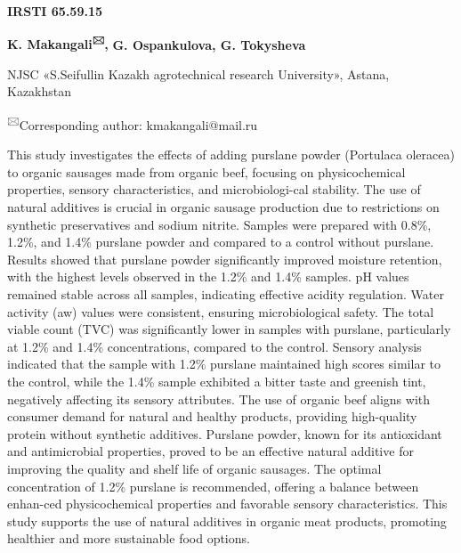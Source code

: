 




\newpage
{\bfseries IRSTI 65.59.15}

\begin{center}

{\bfseries K. Makangali\textsuperscript{🖂},} {\bfseries G. Ospankulova, G.
Tokysheva}

NJSC «S.Seifullin Kazakh agrotechnical research University», Astana,
Kazakhstan
\end{center}

\textsuperscript{🖂}Corresponding author: kmakangali@mail.ru

This study investigates the effects of adding purslane powder (Portulaca
oleracea) to organic sausages made from organic beef, focusing on
physicochemical properties, sensory characteristics, and microbiologi-cal
stability. The use of natural additives is crucial in organic sausage
production due to restrictions on synthetic preservatives and sodium
nitrite. Samples were prepared with 0.8\%, 1.2\%, and 1.4\% purslane
powder and compared to a control without purslane. Results showed that
purslane powder significantly improved moisture retention, with the
highest levels observed in the 1.2\% and 1.4\% samples. pH values
remained stable across all samples, indicating effective acidity
regulation. Water activity (aw) values were consistent, ensuring
microbiological safety. The total viable count (TVC) was significantly
lower in samples with purslane, particularly at 1.2\% and 1.4\%
concentrations, compared to the control. Sensory analysis indicated that
the sample with 1.2\% purslane maintained high scores similar to the
control, while the 1.4\% sample exhibited a bitter taste and greenish
tint, negatively affecting its sensory attributes. The use of organic
beef aligns with consumer demand for natural and healthy products,
providing high-quality protein without synthetic additives. Purslane
powder, known for its antioxidant and antimicrobial properties, proved
to be an effective natural additive for improving the quality and shelf
life of organic sausages. The optimal concentration of 1.2\% purslane is
recommended, offering a balance between enhan-ced physicochemical
properties and favorable sensory characteristics. This study supports
the use of natural additives in organic meat products, promoting
healthier and more sustainable food options.

